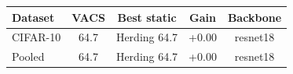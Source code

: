 \begin{tabular}{lcccc}
\toprule
Dataset & VACS & Best static & Gain & Backbone \\
\midrule
CIFAR-10 & 64.7 & Herding 64.7 & +0.00 & resnet18 \\
Pooled & 64.7 & Herding 64.7 & +0.00 & resnet18 \\
\bottomrule
\end{tabular}

